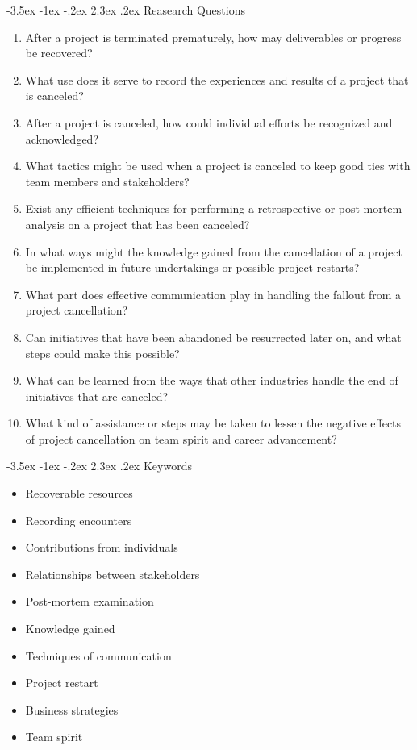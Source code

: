 \documentclass[11pt]{article}
\makeatletter
\renewcommand\section{\@startsection {section}{1}{\z@}%
                                       {-3.5ex \@plus -1ex \@minus -.2ex}%
                                       {2.3ex \@plus.2ex}%
                                       {\normalfont\fontfamily{phv}\fontsize{14}{17}\bfseries}}
\makeatother
\begin{document}
{    \section{Reasearch Questions}
    \begin{enumerate}
        \item After a project is terminated prematurely, how may deliverables or progress be recovered?
        \item What use does it serve to record the experiences and results of a project that is canceled?
        \item After a project is canceled, how could individual efforts be recognized and acknowledged?
        \item What tactics might be used when a project is canceled to keep good ties with team members and stakeholders?
        \item Exist any efficient techniques for performing a retrospective or post-mortem analysis on a project that has been canceled?
        \item In what ways might the knowledge gained from the cancellation of a project be implemented in future undertakings or possible project restarts?
        \item What part does effective communication play in handling the fallout from a project cancellation?
        \item Can initiatives that have been abandoned be resurrected later on, and what steps could make this possible?
        \item What can be learned from the ways that other industries handle the end of initiatives that are canceled?
        \item What kind of assistance or steps may be taken to lessen the negative effects of project cancellation on team spirit and career advancement?
    \end{enumerate}

    \section{Keywords}
    \begin{multicols}{2}
        \begin{itemize}
            \item Recoverable resources
            \item Recording encounters
            \item Contributions from individuals
            \item Relationships between stakeholders
            \item Post-mortem examination
            \item Knowledge gained
            \item Techniques of communication
            \item Project restart
            \item Business strategies
            \item Team spirit
        \end{itemize}
    \end{multicols}

}
\end{document}
